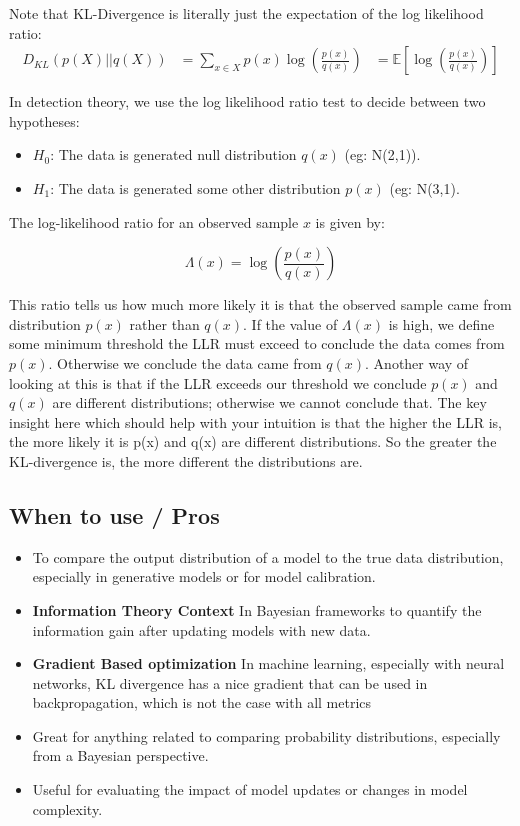 \documentclass[12pt]{article}
\begin{document}
Note that KL-Divergence is literally just the expectation of the log likelihood ratio:
\[
\begin{aligned}
D_{KL}(p(X)||q(X)) &= \sum_{x \in X} p(x) \log\left(\frac{p(x)}{q(x)}\right) &= \mathbb{E}\left[\log\left(\frac{p(x)}{q(x)}\right)\right]
\end{aligned}
\]

In detection theory, we use the log likelihood ratio test to decide between two hypotheses:


\begin{itemize}
    \item \(H_0\): The data is generated null distribution \(q(x)\) (eg: N(2,1)).
    \item \(H_1\): The data is generated some other distribution \(p(x)\) (eg: N(3,1).
\end{itemize}

The log-likelihood ratio for an observed sample \(x\) is given by:

\[ \Lambda(x) = \log\left(\frac{p(x)}{q(x)}\right) \]

This ratio tells us how much more likely it is that the observed sample came from distribution \(p(x)\) rather than \(q(x)\). If the value of \(\Lambda(x)\) is high, we define some minimum threshold the LLR must exceed to conclude the data comes from \(p(x)\). Otherwise we conclude the data came from \(q(x)\). Another way of looking at this is that if the LLR exceeds our threshold we conclude \(p(x)\) and \(q(x)\) are different distributions; otherwise we cannot conclude that. The key insight here which should help with your intuition is that the higher the LLR is, the more likely it is p(x) and q(x) are different distributions. So the greater the KL-divergence is, the more different the distributions are. 

\subsection{When to use / Pros}
\begin{itemize}
    \item To compare the output distribution of a model to the true data distribution, especially in generative models or for model calibration.
    \item  \textbf{Information Theory Context} In Bayesian frameworks to quantify the information gain after updating models with new data.
	\item \textbf{Gradient Based optimization} In machine learning, especially with neural networks, KL divergence has a nice gradient that can be used in backpropagation, which is not the case with all metrics
	\item Great for anything related to comparing probability distributions, especially from a Bayesian perspective.
	\item Useful for evaluating the impact of model updates or changes in model complexity.
\end{itemize}
\end{document}
